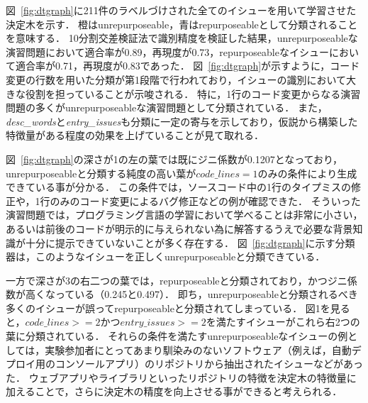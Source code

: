 図~\ref{fig:dtgraph}に211件のラベルづけされた全てのイシューを用いて学習させた決定木を示す．
橙はunrepurposeable，青はrepurposeableとして分類されることを意味する．
10分割交差検証法で識別精度を検証した結果，unrepurposeableな演習問題において適合率が0.89，再現度が0.73，repurposeableなイシューにおいて適合率が0.71，再現度が0.83であった．
図~\ref{fig:dtgraph}が示すように，コード変更の行数を用いた分類が第1段階で行われており，イシューの識別において大きな役割を担っていることが示唆される．
特に，1行のコード変更からなる演習問題の多くがunrepurposeableな演習問題として分類されている．
また，\textit{desc\_words}と\textit{entry\_issues}も分類に一定の寄与を示しており，仮説から構築した特徴量がある程度の効果を上げていることが見て取れる．




図~\ref{fig:dtgraph}の深さが1の左の葉では既にジニ係数が0.1207となっており，unrepurposeableと分類する純度の高い葉が$\textit{code\_lines}=1$のみの条件により生成できている事が分かる．
この条件では，ソースコード中の1行のタイプミスの修正や，1行のみのコード変更によるバグ修正などの例が確認できた．
そういった演習問題では，プログラミング言語の学習において学べることは非常に小さい，あるいは前後のコードが明示的に与えられない為に解答するうえで必要な背景知識が十分に提示できていないことが多く存在する．
図~\ref{fig:dtgraph}に示す分類器は，このようなイシューを正しくunrepurposeableと分類できている．

一方で深さが3の右二つの葉では，repurposeableと分類されており，かつジニ係数が高くなっている（0.245と0.497）．
即ち，unrepurposeableと分類されるべき多くのイシューが誤ってrepurposeableと分類されてしまっている．
図1を見ると，$\textit{code\_lines} >= 2$かつ$\textit{entry\_issues} >= 2$を満たすイシューがこれら右2つの葉に分類されている．
それらの条件を満たすunrepurposeableなイシューの例としては，実験参加者にとってあまり馴染みのないソフトウェア（例えば，自動デプロイ用のコンソールアプリ）のリポジトリから抽出されたイシューなどがあった．
ウェブアプリやライブラリといったリポジトリの特徴を決定木の特徴量に加えることで，さらに決定木の精度を向上させる事ができると考えられる．

